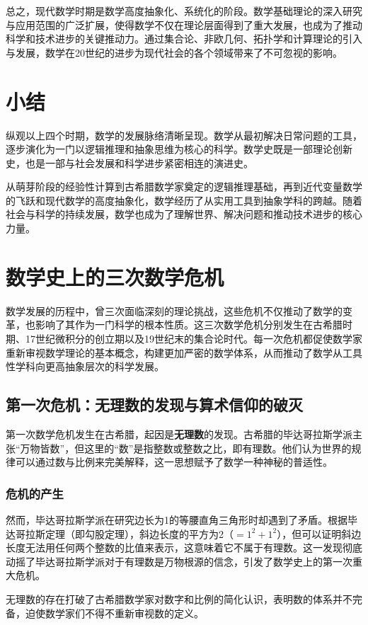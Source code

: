 总之，现代数学时期是数学高度抽象化、系统化的阶段。数学基础理论的深入研究与应用范围的广泛扩展，使得数学不仅在理论层面得到了重大发展，也成为了推动科学和技术进步的关键推动力。通过集合论、非欧几何、拓扑学和计算理论的引入与发展，数学在20世纪的进步为现代社会的各个领域带来了不可忽视的影响。
\section{小结}
纵观以上四个时期，数学的发展脉络清晰呈现。数学从最初解决日常问题的工具，逐步演化为一门以逻辑推理和抽象思维为核心的科学。数学史既是一部理论创新史，也是一部与社会发展和科学进步紧密相连的演进史。

从萌芽阶段的经验性计算到古希腊数学家奠定的逻辑推理基础，再到近代变量数学的飞跃和现代数学的高度抽象化，数学经历了从实用工具到抽象学科的跨越。随着社会与科学的持续发展，数学也成为了理解世界、解决问题和推动技术进步的核心力量。

\section{ 数学史上的三次数学危机}

数学发展的历程中，曾三次面临深刻的理论挑战，这些危机不仅推动了数学的变革，也影响了其作为一门科学的根本性质。这三次数学危机分别发生在古希腊时期、17世纪微积分的创立期以及19世纪末的集合论时代。每一次危机都促使数学家重新审视数学理论的基本概念，构建更加严密的数学体系，从而推动了数学从工具性学科向更高抽象层次的科学发展。

\subsection{第一次危机：无理数的发现与算术信仰的破灭}

第一次数学危机发生在古希腊，起因是{\bf 无理数}的发现。古希腊的毕达哥拉斯学派主张“万物皆数”，但这里的“数”是指整数或整数之比，即有理数。他们认为世界的规律可以通过数与比例来完美解释，这一思想赋予了数学一种神秘的普适性。
\subsubsection{危机的产生}
然而，毕达哥拉斯学派在研究边长为1的等腰直角三角形时却遇到了矛盾。根据毕达哥拉斯定理（即勾股定理），斜边长度的平方为2（$=1^2+1^2$），但可以证明斜边长度无法用任何两个整数的比值来表示，这意味着它不属于有理数。这一发现彻底动摇了毕达哥拉斯学派对于有理数是万物根源的信念，引发了数学史上的第一次重大危机。

无理数的存在打破了古希腊数学家对数字和比例的简化认识，表明数的体系并不完备，迫使数学家们不得不重新审视数的定义。


